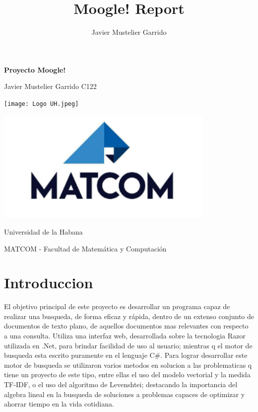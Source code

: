 \documentclass[a4paper,12pt]{article}
\title{Moogle! Report}
\author{Javier Mustelier Garrido}
\begin{document}


\begin{center}
	\thispagestyle{empty}
	\addtocounter{page}{-2} 

	\fontsize{35}{1}
	\bfseries Proyecto Moogle!

	\vspace{1cm}
	
	\Large Javier Mustelier Garrido C122

	\vspace{3cm}

	\texttt{[image: Logo UH.jpeg]}

	\vspace{3cm}

	\includegraphics[width=300pt]{matcom.png}

	\vspace{2cm}

	Universidad de la Habana 
	
	\large MATCOM - Facultad de Matemática y Computación
	
\end{center}
\restoregeometry
\normalsize

\begin{center}
	\thispagestyle{empty}
	\tableofcontents
	\clearpage
\end{center}

\section{Introduccion}

El objetivo principal de este proyecto es desarrollar un programa capaz de realizar una busqueda, de forma eficaz y rápida, dentro de un extenso conjunto de documentos de texto plano, de aquellos documentos mas relevantes con respecto a una consulta. Utiliza una interfaz web, desarrollada sobre la tecnologia Razor utilizada en .Net, para brindar facilidad de uso al usuario; mientras q el motor de busqueda esta escrito puramente en el lenguaje C\#. Para lograr desarrollar este motor de busqueda se utilizaron varios metodos en solucion a las problematicas q tiene un proyecto de este tipo, entre ellas el uso del modelo vectorial y la medida TF-IDF, o el uso del algoritmo de Levenshtei; destacando la importancia del algebra lineal en la busqueda de soluciones a problemas capaces de optimizar y ahorrar tiempo en la vida cotidiana.
\end{document}

